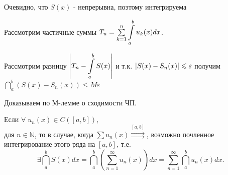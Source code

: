 \begin{plan}
\item Очевидно, что $S(x)$ - непрерывна, поэтому интегрируема
\item Рассмотрим частичные суммы $T_n = \sum\limits_{k=1}^{n}\displaystyle\int\limits_a^b u_k(x)dx$.
\item Рассмотрим разницу $\left\lvert T_n - \displaystyle\int\limits_a^bS(x) \right\rvert$ и т.к. $\left\lvert S(x) - S_n(x) \right\rvert \leqslant \varepsilon$ получим $\dint\limits_a^b (S(x) - S_n(x)) \leqslant M \varepsilon$
\item Доказываем по М-лемме о сходимости ЧП.
\end{plan}
\begin{theorem}
	Если $\forall \; u_n(x) \in C([a,b]), $ \\ для $n \in \mathbb{N}$, то в случае, когда $\sum u_n(x) \overset{[a,b]}{\rightrightarrows}$, возможно почленное интегрирование этого ряда на $[a,b]$, т.е.
	\begin{equation}
	\label{eq:lecture01-32}
	\exists \dint\limits_a^b S(x)dx = \dint\limits_a^b \left(\sum_{n=1}^{\infty}u_n(x)\right)dx = \sum_{n=1}^{\infty} \dint\limits_a^b u_n(x)dx.
	\end{equation}
\end{theorem}
